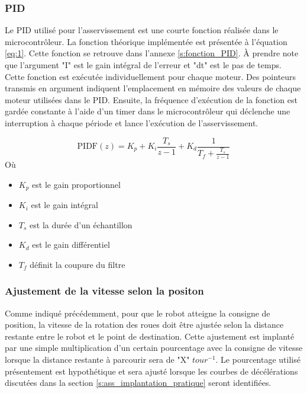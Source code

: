 \subsubsection{PID}
Le PID utilisé pour l'asservissement est une courte fonction réalisée dans le microcontrôleur. La fonction théorique implémentée est présentée à l'équation \ref{eq:1}. Cette fonction se retrouve dans l'annexe \ref{s:fonction_PID}. À prendre note que l'argument "I" est le gain intégral de l'erreur et "dt" est le pas de temps. Cette fonction est exécutée individuellement pour chaque moteur. Des pointeurs transmis en argument indiquent l'emplacement en mémoire des valeurs de chaque moteur utilisées dans le PID. Ensuite, la fréquence d'exécution de la fonction est gardée constante à l'aide d'un timer dans le microcontrôleur qui déclenche une interruption à chaque période et lance l'exécution de l'asservissement.

\begin{equation}
\label{eq:1}
\mbox{PIDF}(z) = K_p + K_i \frac{T_s}{z-1} + K_d \frac{1}{T_f + \frac{T_s}{z -1}}
\end{equation}
Où
\begin{itemize}
\item $K_p$ est le gain proportionnel
\item $K_i$ est le gain intégral
\item $T_s$ est la durée d'un échantillon
\item $K_d$ est le gain différentiel
\item $T_f$ définit la coupure du filtre
\end{itemize}
\subsubsection{Ajustement de la vitesse selon la positon}
Comme indiqué précédemment, pour que le robot atteigne la consigne de position, la vitesse de la rotation des roues doit être ajustée selon la distance restante entre le robot et le point de destination. Cette ajustement est implanté par une simple multiplication d'un certain pourcentage avec la consigne de vitesse lorsque la distance restante à parcourir sera de "X" $tour^{-1}$. Le pourcentage utilisé présentement est hypothétique et sera ajusté lorsque les courbes de décélérations discutées dans la section \ref{s:ass_implantation_pratique} seront identifiées.

